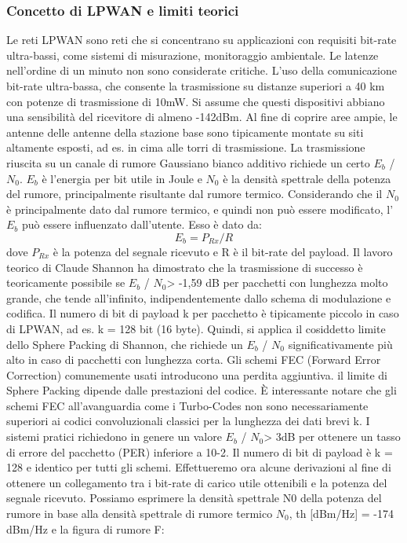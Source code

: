 \documentclass[a4paper]{report} %
\begin{document}
\subsubsection{Concetto di LPWAN e limiti teorici}
Le reti LPWAN sono reti che si concentrano su applicazioni con requisiti bit-rate ultra-bassi, come sistemi di misurazione, monitoraggio ambientale. Le latenze nell'ordine di un minuto non sono considerate critiche. L'uso della comunicazione bit-rate ultra-bassa, che consente la trasmissione su distanze superiori a 40 km con potenze di trasmissione di 10mW. Si assume che questi dispositivi abbiano una sensibilità del ricevitore di almeno -142dBm. Al fine di coprire aree ampie, le antenne delle antenne della stazione base sono tipicamente montate su siti altamente esposti, ad es. in cima alle torri di trasmissione. La trasmissione riuscita su un canale di rumore Gaussiano bianco additivo richiede un certo $ E_{b} $ / $ N_{0} $. 
$ E_{b} $  è l'energia per bit utile in Joule e $ N_{0} $  è la densità spettrale della potenza del rumore, principalmente risultante dal rumore termico. Considerando che il $N_{0}$ è principalmente dato dal rumore termico, e quindi non può essere modificato, l'$E_{b}$ può essere influenzato dall'utente. Esso è dato da:
\begin{equation}
E_{b} = P_{Rx} / R  
\end{equation}
dove $ P_{Rx} $ è la potenza del segnale ricevuto e R è il bit-rate del payload. Il lavoro teorico di Claude Shannon ha dimostrato che la trasmissione di successo è teoricamente possibile se $ E_{b} $ / $ N_{0} $> -1,59 dB per pacchetti con lunghezza molto grande, che tende all’infinito, indipendentemente dallo schema di modulazione e codifica. Il numero di bit di payload k per pacchetto è tipicamente piccolo in caso di LPWAN, ad es. k = 128 bit (16 byte). Quindi, si applica il cosiddetto limite dello Sphere Packing di Shannon, che richiede un $ E_{b} $ / $ N_{0} $ significativamente più alto in caso di pacchetti con lunghezza corta. Gli schemi FEC (Forward Error Correction) comunemente usati introducono una perdita aggiuntiva. il limite di Sphere Packing dipende dalle prestazioni del codice. È interessante notare che gli schemi FEC all'avanguardia come i Turbo-Codes non sono necessariamente superiori ai codici convoluzionali classici per la lunghezza dei dati brevi k. I sistemi pratici richiedono in genere un valore $ E_{b} $ / $ N_{0} $> 3dB per ottenere un tasso di errore del pacchetto (PER) inferiore a 10-2. Il numero di bit di payload è k = 128 e identico per tutti gli schemi. Effettueremo ora alcune derivazioni al fine di ottenere un collegamento tra i bit-rate di carico utile ottenibili e la potenza del segnale ricevuto. Possiamo esprimere la densità spettrale N0 della potenza del rumore in base alla densità spettrale di rumore termico $ N_{0} $, th [dBm/Hz] = -174 dBm/Hz e la figura di rumore F:
\end{document}
